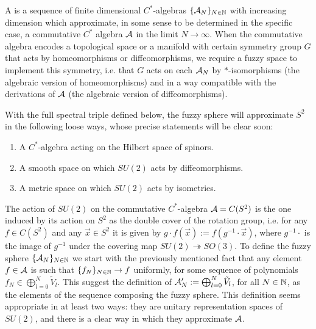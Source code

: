 A  is a sequence of finite dimensional $C^*$-algebras $\{\mathcal A_N\}_{N \in \mathbb{N}}$ with increasing dimension which approximate, in some sense to be determined in the specific case, a commutative $C^*$ algebra $\mathcal A$ in the limit $N \to \infty$. When the commutative algebra encodes a topological space or a manifold with certain symmetry group $G$ that acts by homeomorphisms or diffeomorphisms, we require a fuzzy space to implement this symmetry, i.e. that $G$ acts on each $\mathcal A_N$ by $*$-isomorphisms (the algebraic version of homeomorphisms) and in a way compatible with the derivations of $\mathcal A$ (the algebraic version of diffeomorphisms).

With the full spectral triple defined below, the fuzzy sphere will approximate $S^2$ in the following loose ways, whose precise statements will be clear soon:
    
    \begin{enumerate}
    
    \item A $C^*$-algebra acting on the Hilbert space of spinors.
    
    \item A smooth space on which $SU(2)$ acts by diffeomorphisms.
    
    \item A metric space on which $SU(2)$ acts by isometries.
    
    \end{enumerate}

\lin 

The action of $SU(2)$ on the commutative $C^*$-algebra $\mathcal A = C(S^2)$ is the one induced by its action on $S^2$ as the double cover of the rotation group, i.e. for any $f \in C(S^2)$ and any $\vec x \in S^2$ it is given by $g\cdot f(\vec x) := f(g^{-1} \cdot \vec x)$, where $g^{-1} \cdot $ is the image of $g^{-1}$ under the covering map $SU(2) \twoheadrightarrow SO(3)$. To define the fuzzy sphere $\{\mathcal A_N\}_{N \in \mathbb{N}}$ we start with the 
previously mentioned fact that any element $f \in \mathcal A$ is such that $\{f_N\}_{N \in \mathbb{N}} \to f$ uniformly, for some sequence of polynomials $f_N \in \bigoplus_{l = 0}^N \tilde V_l$. This suggest the definition of $\textcolor{black}{\mathcal A'_N} := \bigoplus_{l = 0}^N \tilde V_l$, for all $N \in \mathbb{N}$, as the elements of the sequence composing the fuzzy sphere. This definition seems appropriate in at least two ways: they are unitary representation spaces of $SU(2)$, and there is a clear way in which they approximate $\mathcal A$.

